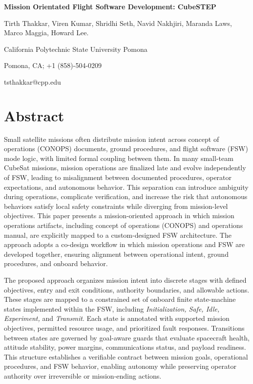 \documentclass[10pt,letterpaper,twoside,fleqn]{article}
\makeatletter
\newcommand{\PaperTitle}{Mission Orientated Flight Software Development: CubeSTEP }
\newcommand{\PaperAuthors}{Tirth Thakkar, Viren Kumar, Shridhi Seth, Navid Nakhjiri, Maranda Laws, Marco Maggia, Howard Lee.}
\newcommand{\AuthorAffiliation}{California Polytechnic State University Pomona}
\newcommand{\AuthorAddress}{Pomona, CA; +1 (858)-504-0209}
\newcommand{\AuthorEmail}{tsthakkar@cpp.edu}
\newcommand{\Indent}{\hspace*{4\fontdimen2\font}}
\newcommand{\PaperNumber}{SSC26-P4-86}
\makeatother
\begin{document}
\noindent
\makebox[\textwidth][r]{%
  {\fontsize{14}{16}\selectfont\bfseries \PaperNumber}%
}

\vspace{34pt}
\begin{center}
{\fontsize{12}{14}\selectfont\bfseries \PaperTitle\par}
\vspace{6pt}
{\fontsize{10}{12}\selectfont \PaperAuthors\par}
\vspace{4pt}
{\fontsize{10}{12}\selectfont \AuthorAffiliation\par}
{\fontsize{10}{12}\selectfont \AuthorAddress\par}
{\fontsize{10}{12}\selectfont \AuthorEmail\par}
\vspace{6pt}
\end{center}

\vspace{4pt}
\begingroup
\setlength{\parskip}{3pt}

\section{Abstract}

\Indent Small satellite missions often distribute mission intent across concept of operations (CONOPS) documents, ground procedures, and flight software (FSW) mode logic, with limited formal coupling between them.
In many small-team CubeSat missions, mission operations are finalized late and evolve independently of FSW, leading to misalignment between documented procedures, operator expectations, and autonomous behavior.
This separation can introduce ambiguity during operations, complicate verification, and increase the risk that autonomous behaviors satisfy local safety constraints while diverging from mission-level objectives.
This paper presents a mission-oriented approach in which mission operations artifacts, including concept of operations (CONOPS) and operations manual, are explicitly mapped to a custom-designed FSW architecture.
The approach adopts a co-design workflow in which mission operations and FSW are developed together, ensuring alignment between operational intent, ground procedures, and onboard behavior.


 The proposed approach organizes mission intent into discrete stages with defined objectives, entry and exit conditions, authority boundaries, and allowable actions.
These stages are mapped to a constrained set of onboard finite state-machine states implemented within the FSW, including \textit{Initialization, Safe, Idle, Experiment,} and \textit{Transmit}.
Each state is annotated with supported mission objectives, permitted resource usage, and prioritized fault responses.
Transitions between states are governed by goal-aware guards that evaluate spacecraft health, attitude stability, power margins, communications status, and payload readiness.
This structure establishes a verifiable contract between mission goals, operational procedures, and FSW behavior, enabling autonomy while preserving operator authority over irreversible or mission-ending actions.
\end{document}
